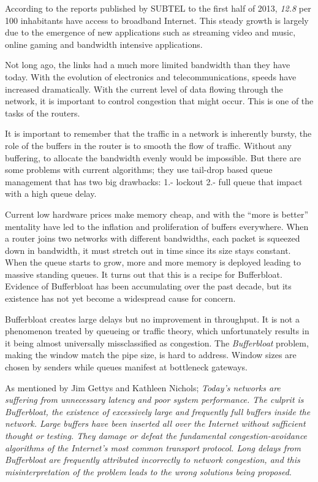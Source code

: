 According to the reports published by SUBTEL to the first half of 2013,
\textit{12.8} per 100 inhabitants have access to broadband
Internet\cite{OCDE}.  This steady growth is largely due to the emergence of
new applications such as streaming video and music, online gaming and
bandwidth intensive applications.

Not long ago, the links had a much more limited bandwidth than they have
today. With the evolution of electronics and telecommunications,
speeds have increased dramatically. With the current level of data flowing
through the network, it is important to control congestion that
might occur. This is one of the tasks of the routers.

It is important to remember that the traffic in a network is inherently
bursty, the role of the buffers in the router is to smooth the flow of
traffic. Without any buffering, to allocate the bandwidth evenly would be
impossible. But there are some problems with current algorithms; they use
tail-drop based queue management that has two big drawbacks: 1.- lockout 2.-
full queue that impact with a high queue delay.

Current low hardware prices make memory cheap,
and with the ``more is better'' mentality have led to the inflation and
proliferation of buffers everywhere\cite{NicholsJacobsonCQD}. When a router
joins two networks with different bandwidths, each packet is squeezed down in
bandwidth, it must stretch out in time since its size stays constant. When
the queue starts to grow, more and more memory is deployed leading to
massive standing queues. It turns out that this is a recipe for Bufferbloat.
Evidence of Bufferbloat has been accumulating over the past decade, but its
existence has not yet become a widespread cause for concern.

Bufferbloat creates large delays but no improvement in throughput. It is not a
phenomenon treated by queueing or traffic theory, which unfortunately results
in it being almost universally missclassified as congestion. The \textit{\gls{Bufferbloat}}
problem, making the window match the pipe size, is hard to address. Window
sizes are chosen by senders while queues manifest at bottleneck gateways.


As mentioned by Jim Gettys and Kathleen Nichols;
\textit{Today's networks are suffering from unnecessary latency and poor
system performance. The culprit is Bufferbloat, the existence of excessively
large and frequently full buffers inside the network. Large buffers have been
inserted all over the Internet without sufficient thought or testing. They
damage or defeat the fundamental congestion-avoidance algorithms of the
Internet's most common transport protocol. Long delays from Bufferbloat are
frequently attributed incorrectly to network congestion, and this
misinterpretation of the problem leads to the wrong solutions being
proposed}\cite{GettysNichols}.

